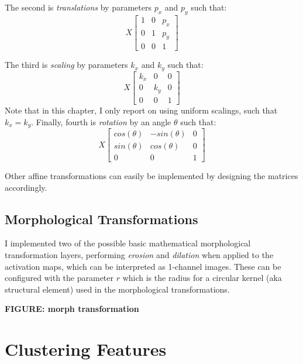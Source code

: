 \noindent The second is \emph{translations} by parameters $p_x$ and $p_y$ such that:
\begin{equation}
X \begin{bmatrix}
1 & 0 & p_x\\
0 & 1 & p_y\\
0 & 0 & 1
\end{bmatrix}
\end{equation}

\noindent The third is \emph{scaling} by parameters $k_x$ and $k_y$ such that:
\begin{equation}
X \begin{bmatrix}
k_x & 0 & 0\\
0 & k_y & 0\\
0 & 0 & 1
\end{bmatrix}
\end{equation}
Note that in this chapter, I only report on using uniform scalings, such that $k_x = k_y$. Finally, fourth is \emph{rotation} by an angle $\theta$ such that:
\begin{equation}
X \begin{bmatrix}
cos(\theta) & -sin(\theta) & 0\\
sin(\theta) & cos(\theta) & 0\\
0 & 0 & 1
\end{bmatrix}
\end{equation}

Other affine transformations can easily be implemented by designing the matrices accordingly.

\subsection{Morphological Transformations}

I implemented two of the possible basic mathematical morphological transformation layers, performing \emph{erosion} and \emph{dilation} \citep{soille1999erosion} when applied to the activation maps, which can be interpreted as 1-channel images. 
These can be configured with the parameter $r$ which is the radius for a circular kernel (aka structural element) used in the morphological transformations.

\textbf{FIGURE: morph transformation}

\section{Clustering Features}
\label{section:clustering}

